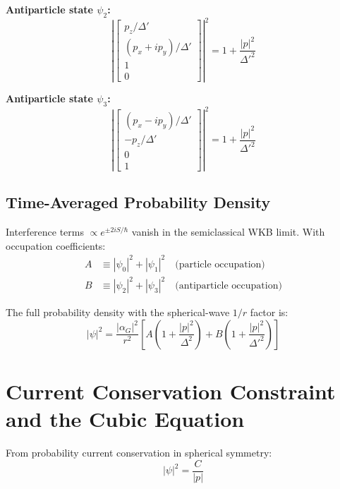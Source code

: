 \documentclass[11pt,a4paper]{article}
\theoremstyle{definition}
\theoremstyle{remark}
\begin{document}
	\textbf{Antiparticle state $\psi_2$:}
	\begin{equation}
		\left|\begin{bmatrix}p_z/\Delta'\\ (p_x+ip_y)/\Delta'\\1\\0\end{bmatrix}\right|^2 = 1 + \frac{|p|^2}{\Delta'^2}
		\label{eq:norm_psi2}
	\end{equation}
	
	\textbf{Antiparticle state $\psi_3$:}
	\begin{equation}
		\left|\begin{bmatrix}(p_x-ip_y)/\Delta'\\ -p_z/\Delta'\\0\\1\end{bmatrix}\right|^2 = 1 + \frac{|p|^2}{\Delta'^2}
		\label{eq:norm_psi3}
	\end{equation}
	
	\subsection{Time-Averaged Probability Density}
	
	Interference terms $\propto e^{\pm 2iS/\hbar}$ vanish in the semiclassical WKB limit.  With occupation coefficients:
	\begin{align}
		A &\equiv |\psi_0|^2+|\psi_1|^2 \quad\text{(particle occupation)} \\
		B &\equiv |\psi_2|^2+|\psi_3|^2 \quad\text{(antiparticle occupation)}
	\end{align}
	
	The full probability density with the spherical-wave $1/r$ factor is:
	\begin{equation}
		\boxed{
			|\psi|^2 = \frac{|\alpha_G|^2}{r^2}\!\left[A\!\left(1+\frac{|p|^2}{\Delta^2}\right)+B\!\left(1+\frac{|p|^2}{\Delta'^2}\right)\right]
		}
		\label{eq:prob_density_general}
	\end{equation}
	
	\section{Current Conservation Constraint and the Cubic Equation}
	
	From probability current conservation in spherical symmetry:
	\begin{equation}
		\boxed{|\psi|^2 = \frac{C}{|p|}}
	\end{equation}
	
\end{document}
